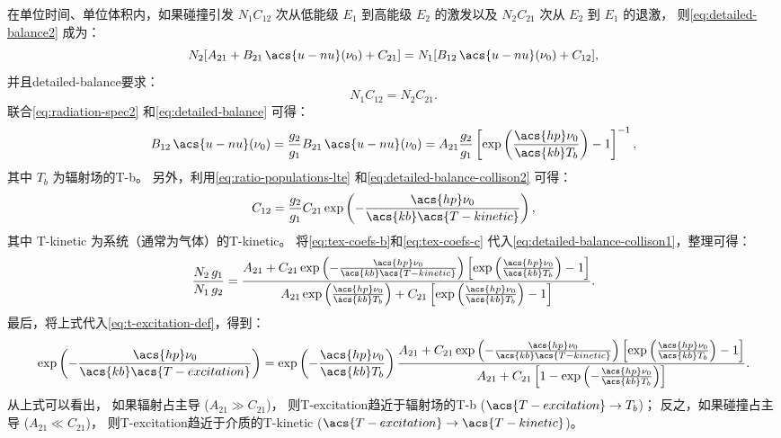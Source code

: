 在单位时间、单位体积内，如果碰撞引发 $N_1 C_{12}$ 次从低能级 $E_1$ 到高能级 $E_2$
的激发以及 $N_2 C_{21}$ 次从 $E_2$ 到 $E_1$ 的退激，
则\autoref{eq:detailed-balance2} 成为：
\begin{equation}
  \label{eq:detailed-balance-collison1}
  N_2 [A_{21} + B_{21} \,\acs{u-nu}(\nu_0) + C_{21}]
    = N_1 [B_{12} \,\acs{u-nu}(\nu_0) + C_{12}] ,
\end{equation}
并且\ac{detailed-balance}要求：
\begin{equation}
  \label{eq:detailed-balance-collison2}
  N_1 C_{12} = N_2 C_{21} .
\end{equation}
联合\autoref{eq:radiation-spec2} 和\autoref{eq:detailed-balance} 可得：
\begin{equation}
  \label{eq:tex-coefs-b}
  B_{12} \,\acs{u-nu}(\nu_0)
    = \frac{g_2}{g_1} B_{21} \,\acs{u-nu}(\nu_0)
    = A_{21} \frac{g_2}{g_1} \left[ \exp\left(
        \frac{\acs{hp} \nu_0}{\acs{kb} T_b} \right) - 1 \right]^{-1} ,
\end{equation}
其中 $T_b$ 为辐射场的\acl{T-b}。
另外，利用\autoref{eq:ratio-populations-lte}
和\autoref{eq:detailed-balance-collison2} 可得：
\begin{equation}
  \label{eq:tex-coefs-c}
  C_{12} = \frac{g_2}{g_1} C_{21}
    \exp\left( - \frac{\acs{hp} \nu_0}{\acs{kb} \acs{T-kinetic}} \right) ,
\end{equation}
其中 \acs{T-kinetic} 为系统（通常为气体）的\acl{T-kinetic}。
将\autoref{eq:tex-coefs-b}和\autoref{eq:tex-coefs-c}
代入\autoref{eq:detailed-balance-collison1}，整理可得：
\begin{equation}
  \frac{N_2\,g_1}{N_1\,g_2} =
    \frac{A_{21} + C_{21}
    \exp\left( -\frac{\acs{hp} \nu_0}{\acs{kb} \acs{T-kinetic}} \right)
      \left[ \exp\left( \frac{\acs{hp} \nu_0}{\acs{kb} T_b} \right)
        - 1 \right]
    }{A_{21} \exp\left( \frac{\acs{hp} \nu_0}{\acs{kb} T_b} \right)
     + C_{21} \left[ \exp\left( \frac{\acs{hp} \nu_0}{\acs{kb} T_b}
       \right) - 1 \right]} .
\end{equation}
最后，将上式代入\autoref{eq:t-excitation-def}，得到：
\begin{equation}
  \label{eq:t-excitation}
  \exp\left(- \frac{\acs{hp} \nu_0}{\acs{kb} \acs{T-excitation}} \right) =
    \exp\left( -\frac{\acs{hp} \nu_0}{\acs{kb} T_b} \right)
    \frac{A_{21} + C_{21} \exp\left(
      -\frac{\acs{hp} \nu_0}{\acs{kb} \acs{T-kinetic}} \right)
      \left[ \exp\left( \frac{\acs{hp} \nu_0}{\acs{kb} T_b} \right)
        - 1 \right]
    }{A_{21} + C_{21} \left[ 1 - \exp\left(
      -\frac{\acs{hp} \nu_0}{\acs{kb} T_b} \right) \right]} .
\end{equation}
从上式可以看出，
如果辐射占主导 ($A_{21} \gg C_{21}$)，
则\acl{T-excitation}趋近于辐射场的\acl{T-b} ($\acs{T-excitation} \to T_b$)；
反之，如果碰撞占主导 ($A_{21} \ll C_{21}$)，
则\acl{T-excitation}趋近于介质的\acl{T-kinetic}
($\acs{T-excitation} \to \acs{T-kinetic}$)。


